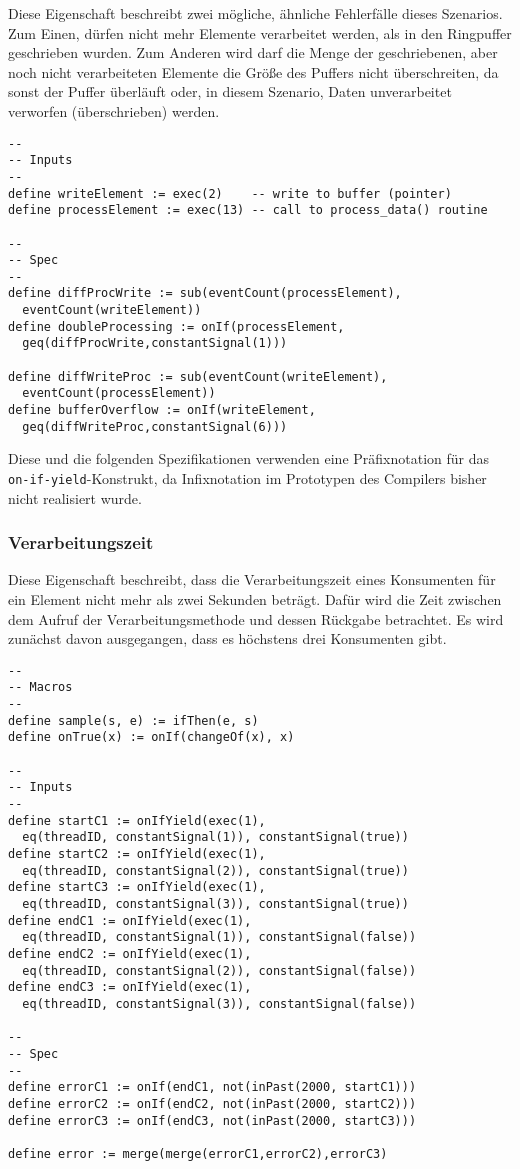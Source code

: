 \documentclass{article}
\begin{document}
Diese Eigenschaft beschreibt zwei mögliche, ähnliche Fehlerfälle dieses Szenarios. Zum Einen,
dürfen nicht mehr Elemente verarbeitet werden, als in den Ringpuffer geschrieben wurden.
Zum Anderen wird darf die Menge der geschriebenen, aber noch nicht verarbeiteten Elemente die Größe des Puffers nicht überschreiten, da sonst der Puffer überläuft oder, in diesem Szenario, Daten unverarbeitet verworfen (überschrieben) werden.

\begin{lstlisting}[language=tessla+salt]
--
-- Inputs
--
define writeElement := exec(2)    -- write to buffer (pointer)
define processElement := exec(13) -- call to process_data() routine

--
-- Spec
--
define diffProcWrite := sub(eventCount(processElement),
  eventCount(writeElement))
define doubleProcessing := onIf(processElement,
  geq(diffProcWrite,constantSignal(1)))

define diffWriteProc := sub(eventCount(writeElement),
  eventCount(processElement))
define bufferOverflow := onIf(writeElement,
  geq(diffWriteProc,constantSignal(6)))
\end{lstlisting}

Diese und die folgenden Spezifikationen verwenden eine Präfixnotation für das \texttt{on-if-yield}-Konstrukt, da Infixnotation im Prototypen des Compilers bisher nicht realisiert wurde.

\subsubsection{Verarbeitungszeit}

Diese Eigenschaft beschreibt, dass die Verarbeitungszeit eines Konsumenten für ein Element nicht mehr als zwei Sekunden beträgt.
Dafür wird die Zeit zwischen dem Aufruf der Verarbeitungsmethode und dessen Rückgabe betrachtet. Es wird zunächst davon ausgegangen, dass es höchstens drei Konsumenten gibt.

\begin{lstlisting}[language=tessla+salt]
--
-- Macros
--
define sample(s, e) := ifThen(e, s)
define onTrue(x) := onIf(changeOf(x), x)

--
-- Inputs
--
define startC1 := onIfYield(exec(1),
  eq(threadID, constantSignal(1)), constantSignal(true))
define startC2 := onIfYield(exec(1),
  eq(threadID, constantSignal(2)), constantSignal(true))
define startC3 := onIfYield(exec(1),
  eq(threadID, constantSignal(3)), constantSignal(true))
define endC1 := onIfYield(exec(1),
  eq(threadID, constantSignal(1)), constantSignal(false))
define endC2 := onIfYield(exec(1),
  eq(threadID, constantSignal(2)), constantSignal(false))
define endC3 := onIfYield(exec(1),
  eq(threadID, constantSignal(3)), constantSignal(false))

--
-- Spec
--
define errorC1 := onIf(endC1, not(inPast(2000, startC1)))
define errorC2 := onIf(endC2, not(inPast(2000, startC2)))
define errorC3 := onIf(endC3, not(inPast(2000, startC3)))

define error := merge(merge(errorC1,errorC2),errorC3)
\end{lstlisting}
\end{document}
